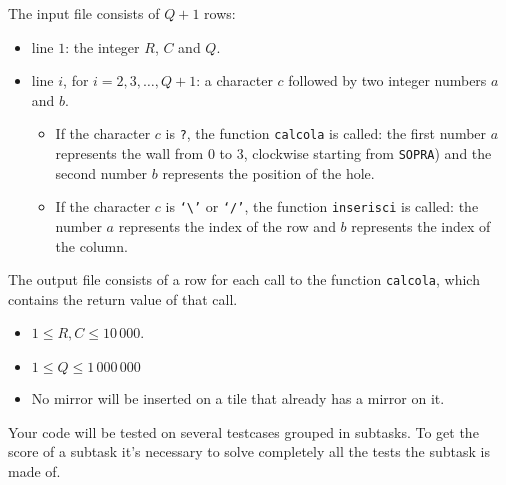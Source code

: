 The input file consists of $Q+1$ rows:
\begin{itemize}[nolistsep,itemsep=2mm]
\item line $1$: the integer $R$, $C$ and $Q$.
\item line $i$, for $i = 2, 3, \dots, Q+1$: a character $c$ followed by two integer numbers $a$ and $b$.
\begin{itemize}
	\item
	    If the character $c$ is \texttt{?}, the function \texttt{calcola} is called:
	    the first number $a$ represents the wall from $0$ to $3$, clockwise starting from \texttt{SOPRA}) and the second number $b$ represents the position of the hole.
	\item
	    If the character $c$ is \texttt{`\textbackslash'} or \texttt{`/'}, the function \texttt{inserisci} is called: the number $a$ represents the index of the row and $b$ represents the index of the column.
\end{itemize}
\end{itemize}

The output file consists of a row for each call to the function \texttt{calcola}, which contains the return value of that call.



\Constraints

\begin{itemize}[nolistsep, itemsep=2mm]
	\item $1 \le R, C \le 10\,000$.
	\item $1 \le Q \le 1\,000\,000$
	\item No mirror will be inserted on a tile that already has a mirror on it.
\end{itemize}



\Scoring

Your code will be tested on several testcases grouped in subtasks.
To get the score of a subtask it's necessary to solve completely all the tests the subtask is made of.

